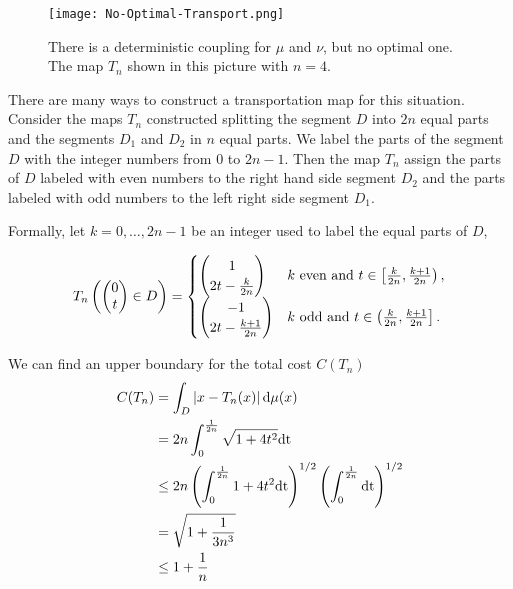 \begin{figure}[H]
	\begin{center}
	\texttt{[image: No-Optimal-Transport.png]}
	\caption{There is a deterministic coupling for $\mu$ and $\nu$, but no optimal one. The map $T_n$ shown in this picture with $n=4$.}	
	\end{center}

\end{figure}


There are many ways to construct a transportation map for this situation. Consider the maps $T_n$ constructed splitting the segment $D$ into $2n$ equal parts and the segments $D_1$ and $D_2$ in $n$ equal parts. We label the parts of the segment $D$ with the integer numbers from $0$ to $2n-1$. Then the map $T_n$ assign the parts of $D$ labeled with even numbers to the right hand side segment $D_2$ and the parts labeled with odd numbers to the left right side segment $D_1$. 

Formally, let $k=0, \dots, 2n-1$ be an integer used to label the equal parts of $D$,

\begin{equation*}
T_n\left( \begin{pmatrix}0\\t\end{pmatrix}\in D \right)=\begin{cases}
\begin{pmatrix}1\\  2t - \frac{k}{2n}\end{pmatrix} & k \text{ even } \mathrm{and} \ t \in \left[\frac{k}{2n}, \frac{k+1}{2n}\right),  \\
\begin{pmatrix}-1 \\  2t- \frac{k+1}{2n}\end{pmatrix} &  k \text{ odd } \mathrm{and} \ t \in \left(\frac{k}{2n}, \frac{k+1}{2n}\right].
\end{cases}
\end{equation*}

We can find an upper boundary for the total cost $C(T_n)$
\begin{align*}
C(T_n)&=\int_{D}\left| x-T_n(x) \right| \mathrm{d}\mu(x)\\&=2n\int_{0}^{\frac{1}{2n}}\sqrt{1+4t^2} \mathrm{dt}\\ &\leq 2n\left( \int_{0}^{\frac{1}{2n}}1+4t^2\mathrm{dt} \right)^{1/2}\left( \int_{0}^{\frac{1}{2n}}\mathrm{dt} \right)^{1/2}\\ &= \sqrt{1+\frac{1}{3n^3}}\\&\leq 1+\frac{1}{n}
\end{align*}

